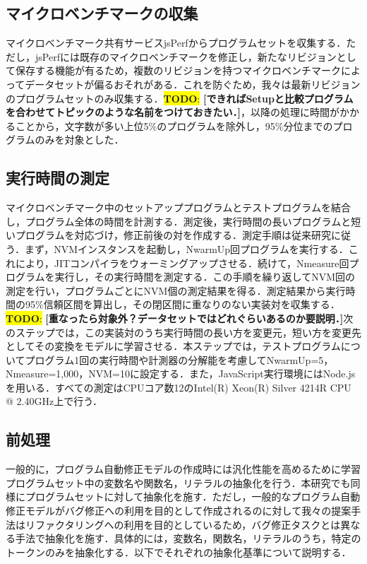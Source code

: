 \documentclass[T,J]{fose} %
\newcommand{\todo}[1]{\colorbox{yellow}{{\bf TODO}:}{\color{red} {\textbf{[#1]}}}}
\begin{document}
\subsection{マイクロベンチマークの収集}
マイクロベンチマーク共有サービスjsPerfからプログラムセットを収集する．ただし，jsPerfには既存のマイクロベンチマークを修正し，新たなリビジョンとして保存する機能が有るため，複数のリビジョンを持つマイクロベンチマークによってデータセットが偏るおそれがある．これを防ぐため，我々は最新リビジョンのプログラムセットのみ収集する．\todo{できればSetupと比較プログラムを合わせてトピックのような名前をつけておきたい．}，以降の処理に時間がかかることから，文字数が多い上位5\%のプログラムを除外し，95\%分位までのプログラムのみを対象とした．

\subsection{実行時間の測定}
マイクロベンチマーク中のセットアッププログラムとテストプログラムを結合し，プログラム全体の時間を計測する．測定後，実行時間の長いプログラムと短いプログラムを対応づけ，修正前後の対を作成する．測定手順は従来研究に従う．まず，NVMインスタンスを起動し，NwarmUp回プログラムを実行する．これにより，JITコンパイラをウォーミングアップさせる．続けて，Nmeasure回プログラムを実行し，その実行時間を測定する．この手順を繰り返してNVM回の測定を行い，プログラムごとにNVM個の測定結果を得る．測定結果から実行時間の95\%信頼区間を算出し，その閉区間に重なりのない実装対を収集する．\todo{重なったら対象外？データセットではどれぐらいあるのか要説明．}次のステップでは，この実装対のうち実行時間の長い方を変更元，短い方を変更先としてその変換をモデルに学習させる．本ステップでは，テストプログラムについてプログラム1回の実行時間や計測器の分解能を考慮してNwarmUp=5，Nmeasure=1,000，NVM=10に設定する．また，JavaScript実行環境にはNode.jsを用いる．すべての測定はCPUコア数12のIntel(R) Xeon(R) Silver 4214R CPU @ 2.40GHz上で行う．


\subsection{前処理}
一般的に，プログラム自動修正モデルの作成時には汎化性能を高めるために学習プログラムセット中の変数名や関数名，リテラルの抽象化を行う．本研究でも同様にプログラムセットに対して抽象化を施す．ただし，一般的なプログラム自動修正モデルがバグ修正への利用を目的として作成されるのに対して我々の提案手法はリファクタリングへの利用を目的としているため，バグ修正タスクとは異なる手法で抽象化を施す．具体的には，変数名，関数名，リテラルのうち，特定のトークンのみを抽象化する．以下でそれぞれの抽象化基準について説明する．
\end{document}
